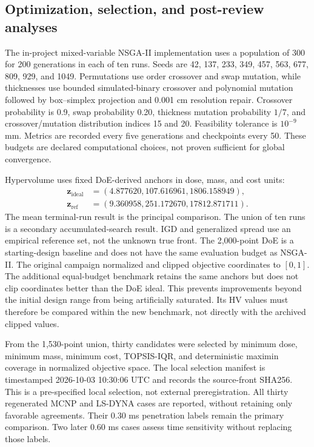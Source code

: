 \documentclass[12pt]{elsarticle}
\begin{document}
\subsection{Optimization, selection, and post-review analyses}
The in-project mixed-variable NSGA-II implementation uses a population of 300 for 200 generations in each of ten runs. Seeds are 42, 137, 233, 349, 457, 563, 677, 809, 929, and 1049. Permutations use order crossover and swap mutation, while thicknesses use bounded simulated-binary crossover and polynomial mutation followed by box--simplex projection and 0.001 cm resolution repair. Crossover probability is 0.9, swap probability 0.20, thickness mutation probability $1/7$, and crossover/mutation distribution indices 15 and 20. Feasibility tolerance is $10^{-9}$ mm. Metrics are recorded every five generations and checkpoints every 50. These budgets are declared computational choices, not proven sufficient for global convergence.

Hypervolume uses fixed DoE-derived anchors in dose, mass, and cost units:
\begin{align*}
\boldsymbol z_{\mathrm{ideal}}&=(4.877620,107.616961,1806.158949),\\
\boldsymbol z_{\mathrm{ref}}&=(9.360958,251.172670,17812.871711).
\end{align*}
The mean terminal-run result is the principal comparison. The union of ten runs is a secondary accumulated-search result. IGD and generalized spread use an empirical reference set, not the unknown true front. The 2,000-point DoE is a starting-design baseline and does not have the same evaluation budget as NSGA-II. The original campaign normalized and clipped objective coordinates to $[0,1]$. The additional equal-budget benchmark retains the same anchors but does not clip coordinates better than the DoE ideal. This prevents improvements beyond the initial design range from being artificially saturated. Its HV values must therefore be compared within the new benchmark, not directly with the archived clipped values.

From the 1,530-point union, thirty candidates were selected by minimum dose, minimum mass, minimum cost, TOPSIS-IQR, and deterministic maximin coverage in normalized objective space. The local selection manifest is timestamped 2026-10-03 10:30:06 UTC and records the source-front SHA256. This is a pre-specified local selection, not external preregistration. All thirty regenerated MCNP and LS-DYNA cases are reported, without retaining only favorable agreements. Their 0.30 ms penetration labels remain the primary comparison. Two later 0.60 ms cases assess time sensitivity without replacing those labels.
\end{document}
